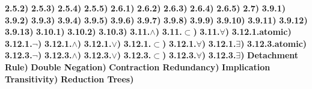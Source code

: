 \documentclass{article}
\begin{document}
{\bf 2.5.2)} 
{\bf 2.5.3)} 
{\bf 2.5.4)} 
\break
{\bf 2.5.5)} 
{\bf 2.6.1)} 
{\bf 2.6.2)} 
\break
{\bf 2.6.3)} 
{\bf 2.6.4)} 
{\bf 2.6.5)} 
{\bf 2.7)} 
{\bf 3.9.1)} 
{\bf 3.9.2)} 
{\bf 3.9.3)} 
{\bf 3.9.4)} 
{\bf 3.9.5)} 
{\bf 3.9.6)} 
\break
{\bf 3.9.7)} 
{\bf 3.9.8)} 
{\bf 3.9.9)} 
{\bf 3.9.10)} 
{\bf 3.9.11)} 
{\bf 3.9.12)} 
{\bf 3.9.13)} 
{\bf 3.10.1)} 
{\bf 3.10.2)} 
{\bf 3.10.3)} 
{\bf 3.11.$\land$)} 
{\bf 3.11.$\subset$)} 
{\bf 3.11.$\forall$)} 
\break
{\bf 3.12.1.atomic)} 
{\bf 3.12.1.$\neg$)} 
{\bf 3.12.1.$\land$)} 
{\bf 3.12.1.$\lor$)} 
{\bf 3.12.1.$\subset$)} 
\break
{\bf 3.12.1.$\forall$)} 
{\bf 3.12.1.$\exists$)} 
{\bf 3.12.3.atomic)} 
{\bf 3.12.3.$\neg$)} 
\break
{\bf 3.12.3.$\land$)} 
{\bf 3.12.3.$\lor$)} 
{\bf 3.12.3.$\subset$)} 
{\bf 3.12.3.$\forall$)} 
\break
{\bf 3.12.3.$\exists$)} 
\break
{\bf Detachment Rule)} 
{\bf Double Negation)} 
{\bf Contraction Redundancy)} 
{\bf Implication Transitivity)} 
\break
{\bf Reduction Trees)} 
\end{document}
